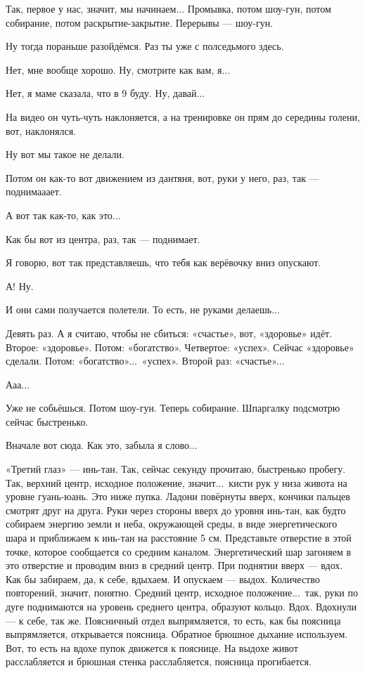 \I
Так, первое у нас,
значит, мы начинаем... Промывка, потом
шоу-гун, потом собирание, потом раскрытие-закрытие. Перерывы --- шоу-гун.

\M
Ну тогда пораньше разойдёмся. Раз ты уже с полседьмого здесь.

\I
Нет, мне вообще хорошо. Ну, смотрите как вам, я...

\M
Нет, я маме сказала, что в 9 буду. Ну, давай...

\I
На видео он чуть-чуть наклоняется, а на тренировке он прям до середины голени, вот, наклонялся.

\M
Ну вот мы такое
не делали.

\I
Потом он как-то вот движением из дантяня, вот, руки у него, раз, так --- поднимааает.

\M
А вот так как-то, как это...

\I
Как бы вот из центра, раз, так --- поднимает.

\M
Я говорю, вот так представляешь, что тебя как верёвочку вниз опускают.

\I
А! Ну.

\M
И они сами получается полетели.
То есть, не руками делаешь...

\I
Девять раз. А я считаю, чтобы
не сбиться: «счастье», вот, «здоровье» идёт. Второе: «здоровье». Потом: «богатство». Четвертое:
«успех».
Сейчас «здоровье» сделали. Потом: «богатство»...\
«успех». Второй раз: «счастье»...

\M
Ааа...

\I
Уже не собьёшься.
Потом шоу-гун.
Теперь собирание. Шпаргалку подсмотрю сейчас быстренько.

\M
Вначале вот сюда. Как это, забыла я слово...

\I
«Третий глаз» --- инь-тан. Так, сейчас секунду прочитаю, быстренько пробегу.
Так, верхний центр, исходное положение, значит...\ кисти рук у низа
живота на уровне гуань-юань. Это ниже пупка.
Ладони повёрнуты вверх, кончики пальцев смотрят друг на друга.
Руки через стороны вверх до уровня инь-тан, как будто собираем энергию земли и неба,
окружающей среды, в виде энергетического шара и приближаем к инь-тан на расстояние 5 см.
Представьте отверстие в
этой точке, которое сообщается со средним каналом.
Энергетический шар загоняем в это отверстие и проводим вниз в средний центр.
При поднятии вверх --- вдох.
Как бы забираем, да, к себе, вдыхаем. И опускаем --- выдох.
Количество повторений, значит, понятно.
Средний центр, исходное положение...\ так, руки по дуге поднимаются на уровень среднего центра,
образуют кольцо. Вдох. Вдохнули --- к себе, так же.
Поясничный отдел выпрямляется, то есть, как бы поясница выпрямляется, открывается поясница.
Обратное брюшное дыхание используем.
Вот, то есть на вдохе пупок движется к пояснице.
На выдохе живот расслабляется
и брюшная стенка
расслабляется, поясница прогибается.

